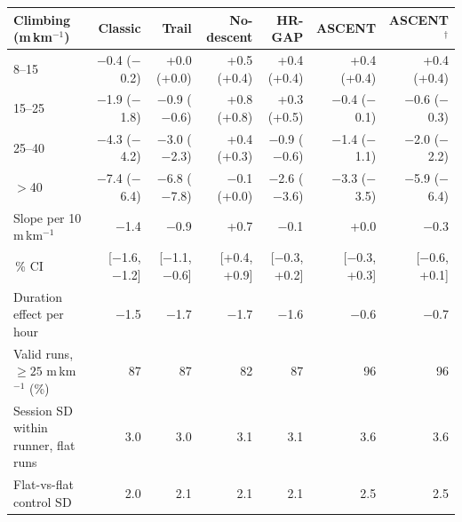 \begin{tabular}{@{}lrrrrrr@{}}
\toprule
Climbing (m\,km$^{-1}$) & Classic & Trail & No-descent & HR-GAP & ASCENT & ASCENT$^{\dagger}$ \\
\midrule
8--15 & $-$0.4 ($-$0.2) & +0.0 (+0.0) & +0.5 (+0.4) & +0.4 (+0.4) & +0.4 (+0.4) & +0.4 (+0.4) \\
15--25 & $-$1.9 ($-$1.8) & $-$0.9 ($-$0.6) & +0.8 (+0.8) & +0.3 (+0.5) & $-$0.4 ($-$0.1) & $-$0.6 ($-$0.3) \\
25--40 & $-$4.3 ($-$4.2) & $-$3.0 ($-$2.3) & +0.4 (+0.3) & $-$0.9 ($-$0.6) & $-$1.4 ($-$1.1) & $-$2.0 ($-$2.2) \\
$>$40 & $-$7.4 ($-$6.4) & $-$6.8 ($-$7.8) & $-$0.1 (+0.0) & $-$2.6 ($-$3.6) & $-$3.3 ($-$3.5) & $-$5.9 ($-$6.4) \\
\midrule
Slope per 10 m\,km$^{-1}$ & $-$1.4 & $-$0.9 & +0.7 & $-$0.1 & +0.0 & $-$0.3 \\
\quad 95\,\% CI & [$-$1.6, $-$1.2] & [$-$1.1, $-$0.6] & [+0.4, +0.9] & [$-$0.3, +0.2] & [$-$0.3, +0.3] & [$-$0.6, +0.1] \\
Duration effect per hour & $-$1.5 & $-$1.7 & $-$1.7 & $-$1.6 & $-$0.6 & $-$0.7 \\
Valid runs, $\geq 25$ m\,km$^{-1}$ (\%) & 87 & 87 & 82 & 87 & 96 & 96 \\
Session SD within runner, flat runs & 3.0 & 3.0 & 3.1 & 3.1 & 3.6 & 3.6 \\
Flat-vs-flat control SD & 2.0 & 2.1 & 2.1 & 2.1 & 2.5 & 2.5 \\
\bottomrule
\end{tabular}